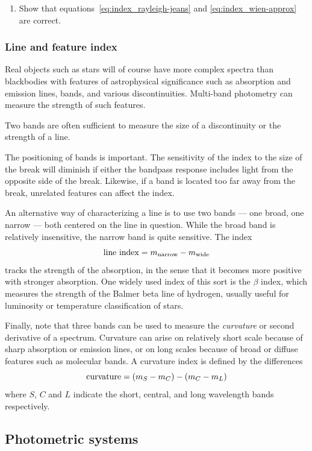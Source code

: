 \begin{enumerate}
\setcounter{enumi}{\value{count}}
\item Show that equations~\ref{eq:index_rayleigh-jeans} and
  \ref{eq:index_wien-approx} are correct.
\setcounter{count}{\value{enumi}} 
\end{enumerate}

\subsubsection{Line and feature index}
Real objects such as stars will of course have more complex spectra
than blackbodies with features of astrophysical significance such as
absorption and emission lines, bands, and various
discontinuities. Multi-band photometry can measure the strength of
such features. 

Two bands are often sufficient to measure the size of a discontinuity
or the strength of a line. 

The positioning of bands is important. The sensitivity of the index to
the size of the break will diminish if either the bandpass response
includes light from the opposite side of the break. Likewise, if a
band is located too far away from the break, unrelated features can
affect the index. 

An alternative way of characterizing a line is to use two bands ---
one broad, one narrow --- both centered on the line in question. While
the broad band is relatively insensitive, the narrow band is quite
sensitive. The index
\[
{\rm line~index}=m_{\rm narrow}-m_{\rm wide}
\]
tracks the strength of the absorption, in the sense that it becomes
more positive with stronger absorption. One widely used index of this
sort is the $\beta$ index, which measures the strength of the Balmer
beta line of hydrogen, usually useful for luminosity or temperature
classification of stars. 

Finally, note that three bands can be used to measure the {\it
  curvature} or second derivative of a spectrum. Curvature can arise
on relatively short scale because of sharp absorption or emission
lines, or on long scales because of broad or diffuse features such as
molecular bands. A curvature index is defined by the differences
\[
{\rm curvature}=(m_S-m_C)-(m_C-m_L)
\]
where $S$, $C$ and $L$ indicate the short, central, and long
wavelength bands respectively.

\subsection{Photometric systems}


